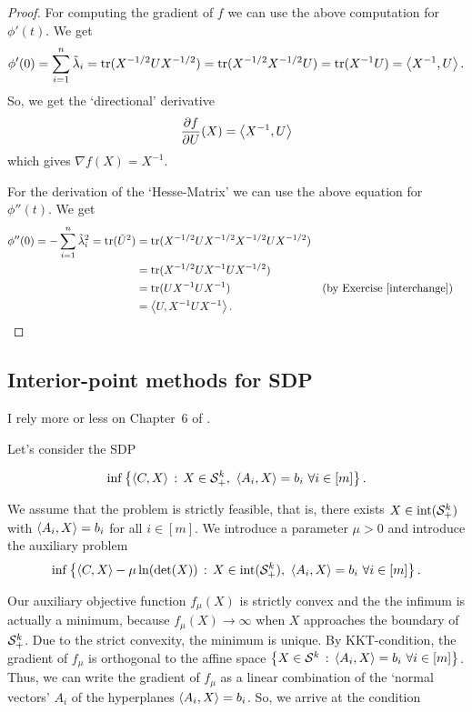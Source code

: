 \begin{proof}
	For computing the gradient of $f$ we can use the above computation for  $\phi'(t)$. We get
	\[
		\phi'(0)= \sum_{i=1}^n \Tilde{\lambda}_i = \operatorname{tr}(X^{-1/2} U X^{-1/2}) = \operatorname{tr}( X^{-1/2} X^{-1/2} U) = \operatorname{tr}(X^{-1} U) = \left\langle X^{-1} , U \right\rangle.
	\]
	So, we get the `directional' derivative
	\[
		\frac{\partial {f}}{\partial {U}}(X) = \left\langle X^{-1} , U \right\rangle
	\]
	which gives $\nabla f(X) = X^{-1}$. 
	
	For the derivation of the `Hesse-Matrix' we can use the above equation for $\phi''(t)$. We get
	\begin{align*}
		\phi''(0) = - \sum_{i=1}^n \Tilde{\lambda}_i^2 = \operatorname{tr}( \Tilde{U}^2) & = \operatorname{tr}(X^{-1/2} U X^{-1/2} X^{-1/2} U X^{-1/2} ) 	
		\\ & = \operatorname{tr}(X^{-1/2} U X^{-1} U X^{-1/2}) 
		\\ & = \operatorname{tr}(U X^{-1} U X^{-1} )  & & \text{(by Exercise~\ref{interchange})}
		\\ & = \left\langle U , X^{-1} U X^{-1} \right\rangle.
	\end{align*}
\end{proof}


\subsection{Interior-point methods for SDP}

I rely more or less on Chapter~6 of \cite{Gaertner:Matousek:2012}.

Let's consider the SDP

\[
	\inf \left\{  \left\langle C , X \right\rangle  \,:\, X\in \mathcal{S}_+^k, \ \left\langle A_i , X \right\rangle=b_i ~ \forall i \in [m] \right\}.
\]

We assume that the problem is strictly feasible, that is, there exists $X \in \operatorname{int}(\mathcal{S}_+^k)$ with $\left\langle A_i , X \right\rangle = b_i$ for all $i \in [m]$. We introduce a parameter $\mu > 0$ and introduce the auxiliary problem
\[
	\inf \setcond{ \sprod{C}{X} - \mu \ln(\det(X)) }{X \in \intr(\cS_+^k), \ \sprod{A_i}{X} = b_i \ \forall i \in [m]}.
\]

Our auxiliary objective function $f_\mu(X)$ is strictly convex and the the infimum is actually a minimum, because $f_\mu(X) \to \infty$ when $X$ approaches the boundary of $\mathcal{S}_+^k$. Due to the strict convexity, the minimum is unique. By KKT-condition, the gradient of $f_\mu$ is orthogonal to the affine space $\left\{ X \in \mathcal{S}^k \,:\, \left\langle A_i , X \right\rangle=b_i \ \forall i \in [m] \right\}$. Thus, we can write the gradient of $f_\mu$ as a linear combination of the `normal vectors' $A_i$ of the hyperplanes $\left\langle A_i , X \right\rangle=b_i$. So, we arrive at the condition 

